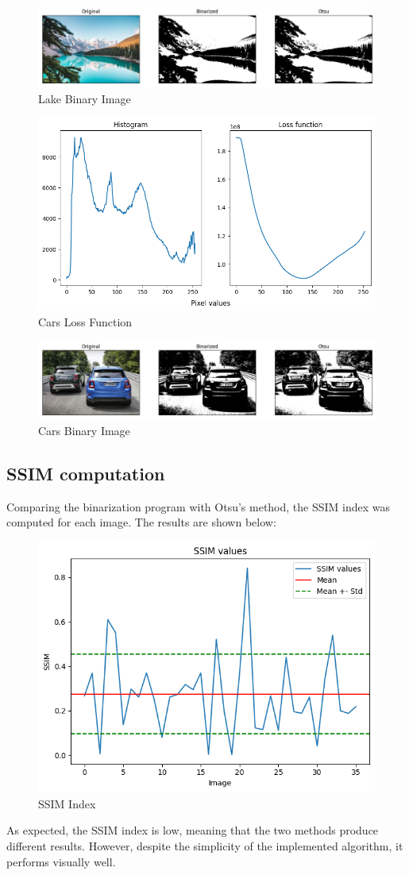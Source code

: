 \begin{figure}[H]
    \centering
    \includegraphics[width=0.6\columnwidth]{../Images/examples/lake_bin.png}
    \caption{Lake Binary Image}
    \label{fig-2}
\end{figure}

\begin{figure}[H]
    \centering
    \includegraphics[width=0.6\columnwidth]{../Images/examples/cars_loss.png}
    \caption{Cars Loss Function}
    \label{fig-3}
\end{figure}

\begin{figure}[H]
    \centering
    \includegraphics[width=0.6\columnwidth]{../Images/examples/cars_bin.png}
    \caption{Cars Binary Image}
    \label{fig-4}
\end{figure}

\subsection{SSIM computation}

Comparing the binarization program with Otsu's method, the SSIM index was computed for each image. The results are shown below:

\begin{figure}[H]
    \centering
    \includegraphics[width=0.6\columnwidth]{../Images/examples/SSIM.png}
    \caption{SSIM Index}
    \label{fig-5}
\end{figure}

\noindent
As expected, the SSIM index is low, meaning that the two methods produce different results. However, despite the simplicity of the implemented algorithm, it performs visually well.
